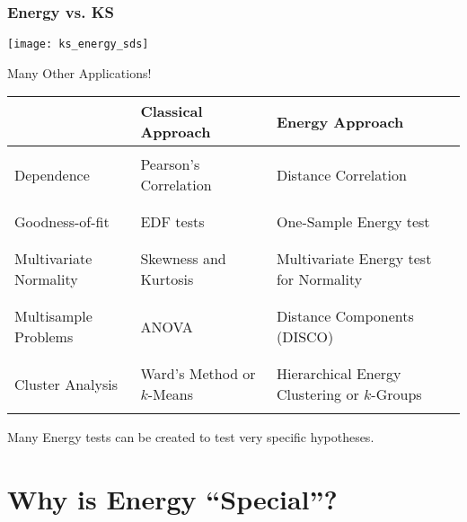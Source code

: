 \documentclass[presentation]{beamer}
\begin{document}
\begin{frame}
  \frametitle{Energy vs. KS}
 \texttt{[image: ks\_energy\_sds]} 
\end{frame}


\begin{frame}{Many Other Applications!}
  \fontsize{7pt}{7.2}\selectfont
  \begin{tabular}[c]{lll}
    \hline
    & \textbf{Classical Approach} & \textbf{Energy Approach} \\
    \hline
    \\
    Dependence & Pearson's Correlation & Distance Correlation \\
    \\
    \hline
    \\
    Goodness-of-fit & EDF tests & One-Sample Energy test \\
    \\
    \hline
    \\
    Multivariate Normality & Skewness and Kurtosis & Multivariate Energy test for Normality \\
    \\
    \hline
    \\
    Multisample Problems & ANOVA & Distance Components (DISCO) \\
    \\
    \hline
    \\
    Cluster Analysis & Ward's Method or $k$-Means & Hierarchical Energy Clustering or $k$-Groups\\
    \\
    \hline
  \end{tabular}
  \begin{block}{}
    Many Energy tests can be created to test very specific hypotheses.
  \end{block}
\end{frame}

\section{Why is Energy ``Special''? }
\end{document}
